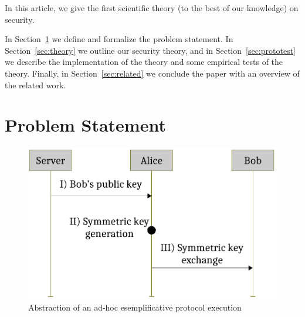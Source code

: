 \documentclass{article}
\newcommand{\Paragraph}[1]{\smallskip\noindent{\bf #1.}}
\theoremstyle{definition}
\theoremstyle{corollary}
\theoremstyle{lemma}
\theoremstyle{theorem}
\theoremstyle{theorem}
\begin{document}
In this article, we give the first scientific theory (to the best of our knowledge)
on security.

\Paragraph{Structure} In Section~\ref{sec:problem} we define and formalize the problem statement. 
In Section~\ref{sec:theory} we outline our security theory, and in Section~\ref{sec:prototest}
we describe the implementation of the theory and some empirical tests of the theory.
Finally, in Section~\ref{sec:related} we conclude the paper with an overview of the related work.


\section{Problem Statement}\label{sec:problem}

\begin{figure}[t]
	\centering
	\includegraphics[width=.6\textwidth]{protocol-example.pdf}
	\caption{Abstraction of an ad-hoc esemplificative protocol execution}
	\label{fig:protocol-example}
\end{figure}
\end{document}
